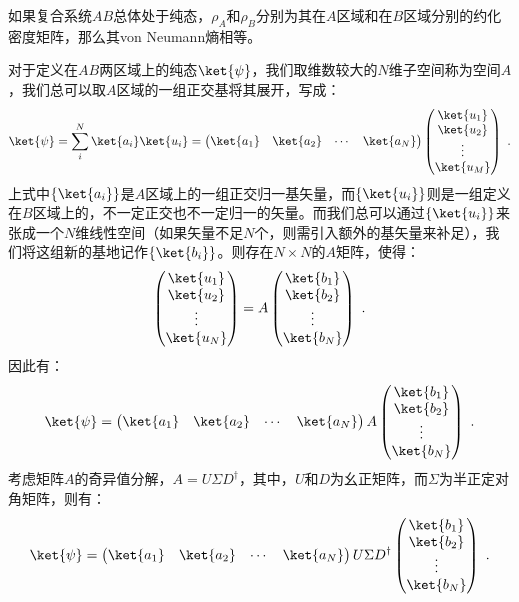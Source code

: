 如果复合系统$AB$总体处于纯态，$\rho_A$和$\rho_B$分别为其在$A$区域和在$B$区域分别的约化密度矩阵，那么其von Neumann熵相等。

对于定义在$AB$两区域上的纯态$\ket{\psi}$，我们取维数较大的$N$维子空间称为空间$A$，我们总可以取$A$区域的一组正交基将其展开，写成：
$$\ket{\psi} = \sum\limits_i^N\ket{a_i}\ket{u_i} = \begin{pmatrix}
\ket{a_1}&\ket{a_2}&\cdots&\ket{a_N}
\end{pmatrix}\begin{pmatrix}
\ket{u_1}\\ \ket{u_2}\\ \vdots\\ \ket{u_M}
\end{pmatrix}~.$$
上式中$\left\{\ket{a_i}\right\}$是$A$区域上的一组正交归一基矢量，而$\left\{\ket{u_i}\right\}$则是一组定义在$B$区域上的，不一定正交也不一定归一的矢量。而我们总可以通过$\left\{\ket{u_i}\right\}$来张成一个$N$维线性空间（如果矢量不足$N$个，则需引入额外的基矢量来补足），我们将这组新的基地记作$\left\{\ket{b_i}\right\}$。则存在$N\times N$的$A$矩阵，使得：
$$\begin{pmatrix}
\ket{u_1}\\ \ket{u_2}\\ \vdots\\ \ket{u_N}
\end{pmatrix} = A
\begin{pmatrix}
\ket{b_1}\\ \ket{b_2}\\ \vdots\\ \ket{b_N}
\end{pmatrix}~.$$
因此有：
$$\ket{\psi} = \begin{pmatrix}
\ket{a_1}&\ket{a_2}&\cdots&\ket{a_N}
\end{pmatrix}A\begin{pmatrix}
\ket{b_1} \\ \ket{b_2} \\ \vdots \\ \ket{b_N}
\end{pmatrix}~.$$
考虑矩阵$A$的奇异值分解，$A = U\Sigma D^\dagger$，其中，$U$和$D$为幺正矩阵，而$\Sigma$为半正定对角矩阵，则有：
$$\ket{\psi} = \begin{pmatrix}
\ket{a_1}&\ket{a_2}&\cdots&\ket{a_N}
\end{pmatrix}U \Sigma D^\dagger\begin{pmatrix}
\ket{b_1} \\ \ket{b_2} \\ \vdots \\ \ket{b_N}
\end{pmatrix}~.$$
